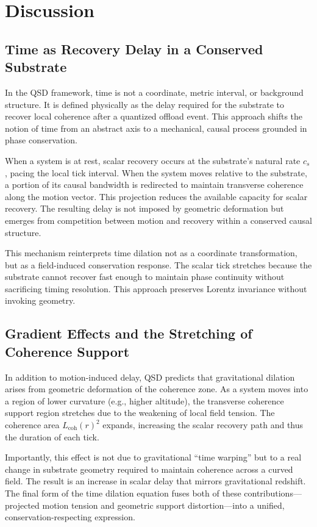 \documentclass[entropy,article,submit,pdftex,moreauthors]{Definitions/mdpi}
\begin{document}
\section{Discussion}

\subsection{Time as Recovery Delay in a Conserved Substrate}

In the QSD framework, time is not a coordinate, metric interval, or background structure. It is defined physically as the delay required for the substrate to recover local coherence after a quantized offload event. This approach shifts the notion of time from an abstract axis to a mechanical, causal process grounded in phase conservation.

When a system is at rest, scalar recovery occurs at the substrate’s natural rate \( c_s \), pacing the local tick interval. When the system moves relative to the substrate, a portion of its causal bandwidth is redirected to maintain transverse coherence along the motion vector. This projection reduces the available capacity for scalar recovery. The resulting delay is not imposed by geometric deformation but emerges from competition between motion and recovery within a conserved causal structure.

This mechanism reinterprets time dilation not as a coordinate transformation, but as a field-induced conservation response. The scalar tick stretches because the substrate cannot recover fast enough to maintain phase continuity without sacrificing timing resolution. This approach preserves Lorentz invariance without invoking geometry.

\subsection{Gradient Effects and the Stretching of Coherence Support}

In addition to motion-induced delay, QSD predicts that gravitational dilation arises from geometric deformation of the coherence zone. As a system moves into a region of lower curvature (e.g., higher altitude), the transverse coherence support region stretches due to the weakening of local field tension. The coherence area \( L_{\text{coh}}(r)^2 \) expands, increasing the scalar recovery path and thus the duration of each tick.

Importantly, this effect is not due to gravitational ``time warping'' but to a real change in substrate geometry required to maintain coherence across a curved field. The result is an increase in scalar delay that mirrors gravitational redshift. The final form of the time dilation equation fuses both of these contributions—projected motion tension and geometric support distortion—into a unified, conservation-respecting expression.
\end{document}
